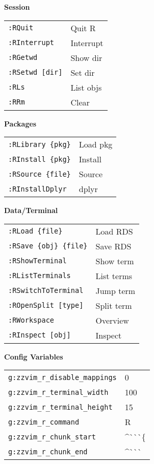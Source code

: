 \documentclass[10pt,a4paper]{article}
\begin{document}
\begin{multicols}{3}
\vspace{3pt}
\textbf{Session}\\
\begin{tabular}{@{}L{2.93cm}L{2.54cm}@{}}
\texttt{:RQuit} & Quit R \\
\texttt{:RInterrupt} & Interrupt \\
\texttt{:RGetwd} & Show dir \\
\texttt{:RSetwd [dir]} & Set dir \\
\texttt{:RLs} & List objs \\
\texttt{:RRm} & Clear \\
\end{tabular}

\vspace{3pt}
\textbf{Packages}\\
\begin{tabular}{@{}L{2.93cm}L{2.54cm}@{}}
\texttt{:RLibrary \{pkg\}} & Load pkg \\
\texttt{:RInstall \{pkg\}} & Install \\
\texttt{:RSource \{file\}} & Source \\
\texttt{:RInstallDplyr} & dplyr \\
\end{tabular}

\textbf{Data/Terminal}\\
\begin{tabular}{@{}L{2.93cm}L{2.54cm}@{}}
\texttt{:RLoad \{file\}} & Load RDS \\
\texttt{:RSave \{obj\} \{file\}} & Save RDS \\
\texttt{:RShowTerminal} & Show term \\
\texttt{:RListTerminals} & List terms \\
\texttt{:RSwitchToTerminal} & Jump term \\
\texttt{:ROpenSplit [type]} & Split term \\
\texttt{:RWorkspace} & Overview \\
\texttt{:RInspect [obj]} & Inspect \\
\end{tabular}

\vspace{4pt}
\textbf{Config Variables}\\
\begin{tabular}{@{}L{3.9cm}L{1.56cm}@{}}
\texttt{g:zzvim\_r\_disable\_mappings} & 0 \\
\texttt{g:zzvim\_r\_terminal\_width} & 100 \\
\texttt{g:zzvim\_r\_terminal\_height} & 15 \\
\texttt{g:zzvim\_r\_command} & R \\
\texttt{g:zzvim\_r\_chunk\_start} & \^{}\`{}\`{}\`{}\{ \\
\texttt{g:zzvim\_r\_chunk\_end} & \^{}\`{}\`{}\`{} \\
\end{tabular}


\end{multicols}
\end{document}
